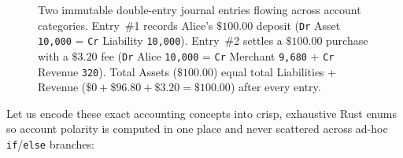 \begin{figure}[H]
\caption{Two immutable double-entry journal entries flowing across account categories. Entry~\#1 records Alice's $\$100.00$ deposit (\texttt{Dr} Asset \texttt{10,000} = \texttt{Cr} Liability \texttt{10,000}). Entry~\#2 settles a $\$100.00$ purchase with a $\$3.20$ fee (\texttt{Dr} Alice \texttt{10,000} = \texttt{Cr} Merchant \texttt{9,680} + \texttt{Cr} Revenue \texttt{320}). Total Assets ($\$100.00$) equal total Liabilities + Revenue ($\$0 + \$96.80 + \$3.20 = \$100.00$) after every entry.}
\label{ch13:fig-double-entry}
\end{figure}

Let us encode these exact accounting concepts into crisp, exhaustive Rust enums so account polarity is computed in one place and never scattered across ad-hoc \texttt{if}/\texttt{else} branches:

